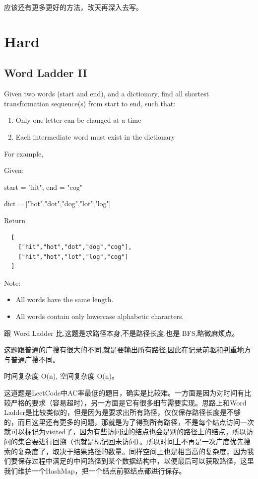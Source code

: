 \documentclass[12pt]{book}
\begin{document}
应该还有更多更好的方法，改天再深入去写。

\section{Hard}
\label{sec-10-2}
\subsection{Word Ladder II}
\label{sec-10-2-1}
Given two words (start and end), and a dictionary, find all shortest transformation sequence(s) from start to end, such that:
\begin{enumerate}
\item Only one letter can be changed at a time
\item Each intermediate word must exist in the dictionary
\end{enumerate}
For example,

Given:

start = "hit", end = "cog"

dict = ["hot","dot","dog","lot","log"]

Return
\lstset{language=java,label= ,caption= ,numbers=none}
\begin{lstlisting}
  [
    ["hit","hot","dot","dog","cog"],
    ["hit","hot","lot","log","cog"]
  ]
\end{lstlisting}

Note:
\begin{itemize}
\item All words have the same length.
\item All words contain only lowercase alphabetic characters.
\end{itemize}

跟 Word Ladder 比,这题是求路径本身,不是路径长度,也是 BFS,略微麻烦点。

这题跟普通的广搜有很大的不同,就是要输出所有路径,因此在记录前驱和判重地方与普通广搜不同。

时间复杂度 O(n), 空间复杂度 O(n)。

这道题是LeetCode中AC率最低的题目，确实是比较难。一方面是因为对时间有比较严格的要求（容易超时），另一方面是它有很多细节需要实现。思路上和Word Ladder是比较类似的，但是因为是要求出所有路径，仅仅保存路径长度是不够的，而且这里还有更多的问题，那就是为了得到所有路径，不是每个结点访问一次就可以标记为visited了，因为有些访问过的结点也会是别的路径上的结点，所以访问的集合要进行回溯（也就是标记回未访问）。所以时间上不再是一次广度优先搜索的复杂度了，取决于结果路径的数量。同样空间上也是相当高的复杂度，因为我们要保存过程中满足的中间路径到某个数据结构中，以便最后可以获取路径，这里我们维护一个HashMap，把一个结点前驱结点都进行保存。
\end{document}
